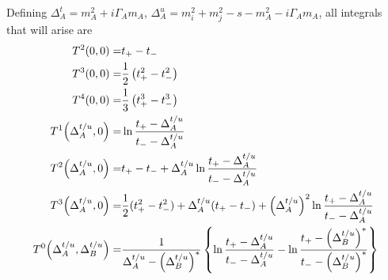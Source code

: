 \documentclass[../main.tex]{subfiles}
\begin{document}
Defining \(\Delta_A^t = m_A^2 + i\Gamma_A m_A\), \(\Delta_A^u = m_i^2 + m_j^2 - s - m_A^2 - i\Gamma_A m_A\), all integrals that will arise are
\begin{subequations}
	\begin{align}
		T^2(0, 0) =                                     & t_+ - t_-                                                                                                                                                                                                                                                 \\
		T^3(0, 0) =                                     & \frac{1}{2} \pclosed{t_+^2 - t_-^2}                                                                                                                                                                                                                       \\
		T^4(0, 0) =                                     & \frac{1}{3} \pclosed{t_+^3 - t_-^3}                                                                                                                                                                                                                       \\
		T^1\!\pclosed{\Delta_A^{t/u}, 0} =              & \ln\frac{t_+ - \Delta_A^{t/u}}{t_- - \Delta_A^{t/u}}                                                                                                                                                                                                      \\
		T^2\!\pclosed{\Delta_A^{t/u}, 0} =              & t_+ - t_- + \Delta_A^{t/u} \ln\frac{t_+ - \Delta_A^{t/u}}{t_- - \Delta_A^{t/u}}                                                                                                                                                                           \\
		T^3\!\pclosed{\Delta_A^{t/u}, 0} =              & \frac{1}{2}(t_+^2 - t_-^2) + \Delta_A^{t/u}(t_+ - t_-) + \pclosed{\Delta_A^{t/u}}^2 \ln\frac{t_+ - \Delta_A^{t/u}}{t_- - \Delta_A^{t/u}}                                                                                                                  \\
		T^0\!\pclosed{\Delta_A^{t/u}, \Delta_B^{t/u}} = & \frac{1}{\Delta_A^{t/u} - \pclosed{\Delta_B^{t/u}}^\ast} \cclosed{\ln\frac{t_+ - \Delta_A^{t/u}}{t_- - \Delta_A^{t/u}} - \ln\frac{t_+ - \pclosed{\Delta_B^{t/u}}^\ast}{t_- - \pclosed{\Delta_B^{t/u}}^\ast}}                                              \\

\end{align}
\end{subequations}
\end{document}

